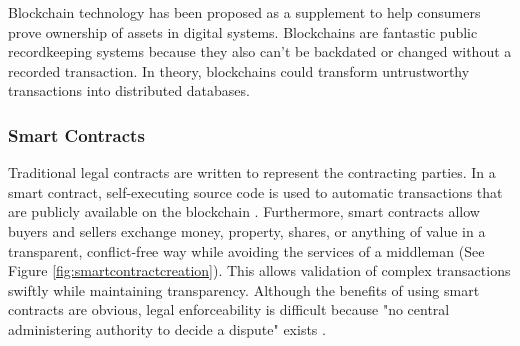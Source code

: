 	Blockchain technology has been proposed as a supplement to help consumers prove ownership of assets in digital systems.  Blockchains are fantastic public recordkeeping systems because they also can’t be backdated or changed without a recorded transaction. In theory, \glspl{blockchain} could transform untrustworthy transactions into distributed databases.
	
	
	
	
		 


\subsubsection{Smart Contracts}
		Traditional legal contracts are written to represent the contracting parties. In a smart contract, self-executing source code is used to automatic transactions that are publicly available on the blockchain \cite{ethereumWhitePaper:Online}.
		Furthermore, \glspl{smart contract} allow buyers and sellers exchange money, property, shares, or anything of value in a transparent, conflict-free way while avoiding the services of a middleman (See Figure \ref{fig:smartcontractcreation}). This allows validation of complex transactions swiftly while maintaining transparency. Although the benefits of using smart contracts are obvious, legal enforceability is difficult because "no central administering authority to decide a dispute" exists \cite{keyfindings:Online}. 


